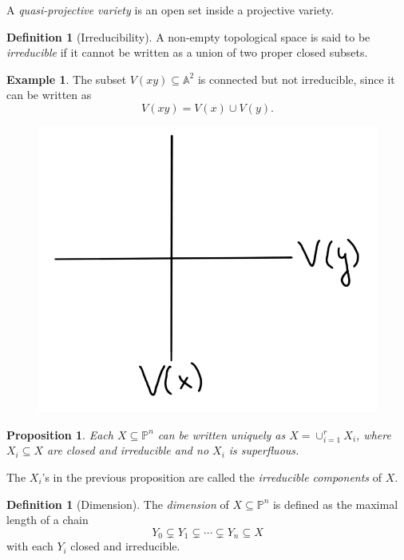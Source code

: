 \documentclass[12pt,a4paper]{amsart}
\theoremstyle{plain}
\newtheorem{prop}[thm]{Proposition}
\theoremstyle{definition}
\newtheorem{defn}[thm]{Definition}
\newtheorem{exmp}[thm]{Example}
\theoremstyle{remark}
\begin{document}
A \textit{quasi-projective variety} is an open set inside a projective variety.

\begin{defn}[Irreducibility]
    A non-empty topological space is said to be \textit{irreducible} if it cannot be written as a union of two proper closed subsets.
\end{defn}

\begin{exmp}
    The subset $V(xy)\subseteq \mathbb{A}^{2}$ is connected but not irreducible, since it can be written as
    \[ V(xy)=V(x)\cup V(y). \]
    \begin{figure}[H]
	\centering
	\includegraphics[scale=.15]{pictures/axes}
    \end{figure}
\end{exmp}

\begin{prop}
    Each $X\subseteq \mathbb{P}^{n}$ can be written uniquely as $X=\cup_{i=1}^{r}X_{i}$, where $X_{i}\subseteq X$ are closed and irreducible and no $X_{i}$ is superfluous.
\end{prop}

The $X_{i}$'s in the previous proposition are called the \textit{irreducible components} of $X$.

\begin{defn}[Dimension]
    The \textit{dimension} of $X\subseteq \mathbb{P}^{n}$ is defined as the maximal length of a chain
    \[ Y_{0}\subsetneq Y_{1}\subsetneq \cdots \subsetneq Y_{n}\subseteq X \]
    with each $Y_{i}$ closed and irreducible.
\end{defn}
\end{document}
